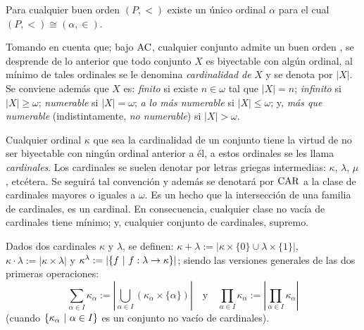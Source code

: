 \begin{teorema}[de enumeración]\label{teo-enumeracion}
	Para cualquier buen orden $(P,<)$ existe un único ordinal $\alpha$ para el cual $(P,<) \cong (\alpha, \in)$.
\end{teorema}

Tomando en cuenta que; bajo $\operatorname{AC}$, cualquier conjunto admite un buen orden \cite[Teo.~5.1, p.~48]{jechSet}, se desprende de lo anterior que todo conjunto $X$ es biyectable con algún ordinal, al mínimo de tales ordinales se le denomina \textit{cardinalidad de} $X$ y se denota por $|X|$. Se conviene además que $X$ es: \textit{finito} si existe $n \in \omega$ tal que $|X|=n$; \textit{infinito} si $|X|\geq \omega$; \textit{numerable} si $|X|=\omega$; \textit{a lo más numerable} si $|X|\leq \omega$; y, \textit{más que numerable} (indistintamente, \textit{no numerable}) si $|X|>\omega$.

\index[sym]{$\CAR$}
Cualquier ordinal $\kappa$ que sea la cardinalidad de un conjunto tiene la virtud de no ser biyectable con ningún ordinal anterior a él, a estos ordinales se les llama \textit{cardinales}. Los cardinales se suelen denotar por letras griegas intermedias: $\kappa$, $\lambda$, $\mu$, etcétera. Se seguirá tal convención y además se denotará por $\CAR$ a la clase de cardinales mayores o iguales a $\omega$. Es un hecho que la intersección de una familia de cardinales, es un cardinal. En consecuencia, cualquier clase no vacía de cardinales tiene mínimo; y, cualquier conjunto de cardinales, supremo.

\index[sym]{$\kappa + \lambda$}\index[sym]{$\kappa \cdot \lambda$}\index[sym]{$\kappa ^ \lambda$}
Dados dos cardinales $\kappa$ y $\lambda$, se definen: $\kappa + \lambda:=|\kappa \times \{0\} \cup \lambda \times \{1\}|$, $\kappa \cdot \lambda:= |\kappa \times \lambda|$ y $\kappa ^ \lambda:= |\{f \text{ $|$ } f:\lambda \to \kappa\}|$; siendo las versiones generales de las dos primeras operaciones:
\[ \sum_{\alpha \in I} \kappa_\alpha := \left|\bigcup_{\alpha \in I} (\kappa_\alpha \times \{\alpha\})\right| \quad \text{y} \quad \prod_{\alpha \in I} \kappa_\alpha := \left|\prod_{\alpha \in I} \kappa_\alpha\right| \]
(cuando $\{\kappa_\alpha \text{ $|$ } \alpha \in I\}$ es un conjunto no vacío de cardinales).

